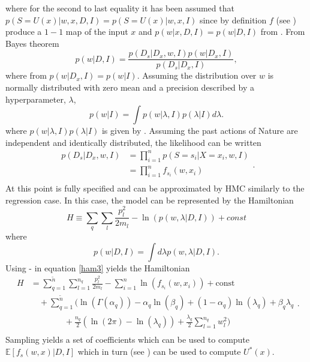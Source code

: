where for the second to last equality it has been assumed that $p(S = U(x)|w,x,D,I) = p(S = U(x)|w,x,I)$ since by definition $f$ (see ) produce a $1-1$ map of the input $x$ and $p(w|x,D,I) = p(w|D,I)$ from . From Bayes theorem
\begin{equation}
	p(w|D,I) =\frac{p(D_s|D_x,w,I)p(w|D_x,I)}{p(D_s|D_x,I)},
\end{equation}
where from  $p(w|D_x,I) = p(w|I)$. Assuming the distribution over $w$ is normally distributed with zero mean and a precision described by a hyperparameter, $\lambda$, 
\begin{equation}
	p(w|I) = \int p(w|\lambda,I)p(\lambda|I)d\lambda.
\end{equation}
where $p(w|\lambda,I)p(\lambda|I)$ is given by . Assuming the past actions of Nature are independent and identically distributed, the likelihood can be written~\citep{Fischer1999} 
\begin{equation}
	\begin{split}
		p(D_s|D_x,w,I) &=\prod_{i=1}^{n}p(S = s_i|X = x_i,w,I)\\
		&=\prod_{i=1}^{n}f_{s_i}(w,x_i)\\
	\end{split}.
	\label{lik}
\end{equation}
At this point  is fully specified and can be approximated by HMC similarly to the regression case. In this case, the model can be represented by the Hamiltonian 
\begin{equation}
	H \equiv  \sum_{q}\sum_{l}\frac{p_{l}^2}{2m_{l}}-\ln(p(w,\lambda|D,I))+const
	\label{ham3}
\end{equation}
where
\begin{equation}
	p(w|D,I) = \int d\lambda p(w,\lambda|D,I).
\end{equation}
Using - in equation \eqref{ham3} yields the Hamiltonian
\begin{equation}
	\begin{split}
		H&=\sum_{q=1}^{\tilde{n}}\sum_{l=1}^{n_q}\frac{p_{l}^2}{2m_{l}}-\sum_{i=1}^{n}\ln(f_{s_i}(w,x_i))+\text{const}\\
		&\quad+\sum_{q=1}^{\tilde{n}}\bigg(\ln(\Gamma(\alpha_q))-\alpha_q\ln(\beta_q)+(1-\alpha_q)\ln(\lambda_q)+\beta_q\lambda_q\\
		&\qquad \qquad+\frac{n_q}{2}(\ln(2\pi)-\ln(\lambda_q))+\frac{\lambda_q}{2}\sum_{l=1}^{n_q}w_l^2\bigg)\\
	\end{split}.
	\label{ham2}
\end{equation}
Sampling  yields a set of coefficients which can be used to compute $\mathbb{E}[f_s(w,x)|D,I]$ which in turn (see ) can be used to compute $U^*(x)$.